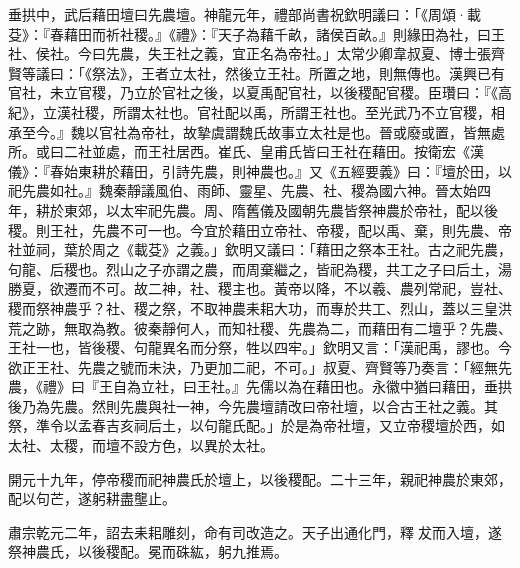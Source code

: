 \begin{pinyinscope}
 垂拱中，武后藉田壇曰先農壇。神龍元年，禮部尚書祝欽明議曰：「《周頌·載芟》：『春藉田而祈社稷。』《禮》：『天子為藉千畝，諸侯百畝。』則緣田為社，曰王社、侯社。今曰先農，失王社之義，宜正名為帝社。」太常少卿韋叔夏、博士張齊賢等議曰：「《祭法》，王者立太社，然後立王社。所置之地，則無傳也。漢興已有官社，未立官稷，乃立於官社之後，以夏禹配官社，以後稷配官稷。臣瓚曰：『《高紀》，立漢社稷，所謂太社也。官社配以禹，所謂王社也。至光武乃不立官稷，相承至今。』魏以官社為帝社，故摯虞謂魏氏故事立太社是也。晉或廢或置，皆無處所。或曰二社並處，而王社居西。崔氏、皇甫氏皆曰王社在藉田。按衛宏《漢儀》：『春始東耕於藉田，引詩先農，則神農也。』又《五經要義》曰：『壇於田，以祀先農如社。』魏秦靜議風伯、雨師、靈星、先農、社、稷為國六神。晉太始四年，耕於東郊，以太牢祀先農。周、隋舊儀及國朝先農皆祭神農於帝社，配以後稷。則王社，先農不可一也。今宜於藉田立帝社、帝稷，配以禹、棄，則先農、帝社並祠，葉於周之《載芟》之義。」欽明又議曰：「藉田之祭本王社。古之祀先農，句龍、后稷也。烈山之子亦謂之農，而周棄繼之，皆祀為稷，共工之子曰后土，湯勝夏，欲遷而不可。故二神，社、稷主也。黃帝以降，不以羲、農列常祀，豈社、稷而祭神農乎？社、稷之祭，不取神農耒耜大功，而專於共工、烈山，蓋以三皇洪荒之跡，無取為教。彼秦靜何人，而知社稷、先農為二，而藉田有二壇乎？先農、王社一也，皆後稷、句龍異名而分祭，牲以四牢。」欽明又言：「漢祀禹，謬也。今欲正王社、先農之號而未決，乃更加二祀，不可。」叔夏、齊賢等乃奏言：「經無先農，《禮》曰『王自為立社，曰王社。』先儒以為在藉田也。永徽中猶曰藉田，垂拱後乃為先農。然則先農與社一神，今先農壇請改曰帝社壇，以合古王社之義。其祭，準令以孟春吉亥祠后土，以句龍氏配。」於是為帝社壇，又立帝稷壇於西，如太社、太稷，而壇不設方色，以異於太社。



 開元十九年，停帝稷而祀神農氏於壇上，以後稷配。二十三年，親祀神農於東郊，配以句芒，遂躬耕盡壟止。



 肅宗乾元二年，詔去耒耜雕刻，命有司改造之。天子出通化門，釋犮而入壇，遂祭神農氏，以後稷配。冕而硃紘，躬九推焉。




\end{pinyinscope}
